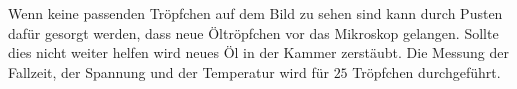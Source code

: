 \documentclass[
  bibliography=totoc,     %
  captions=tableheading,  %
  titlepage=firstiscover, %
]{scrartcl}
\begin{document}
\noindent
Wenn keine passenden Tröpfchen auf dem Bild zu sehen sind kann durch
Pusten dafür gesorgt werden, dass neue Öltröpfchen vor das Mikroskop
gelangen. Sollte dies nicht weiter helfen wird neues Öl in der Kammer
zerstäubt. Die Messung der Fallzeit, der Spannung und der Temperatur
wird für $25$ Tröpfchen durchgeführt.
\clearpage


\nocite{*}
\printbibliography
\end{document}
